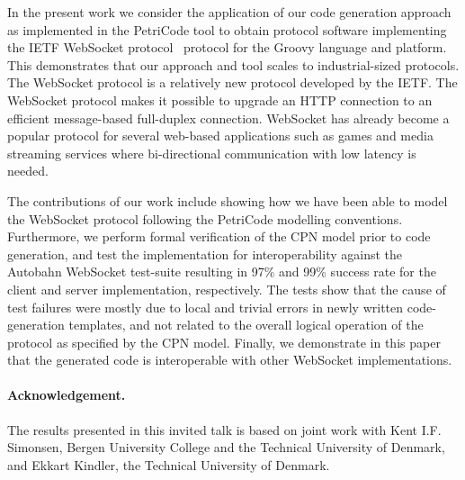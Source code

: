 \documentclass[a4paper]{llncs}
\begin{document}

In the present work we consider the application of our code generation 
approach as
implemented in the PetriCode tool to obtain protocol software
implementing the IETF WebSocket protocol~\cite{fette2011websocket}
protocol for the Groovy language and platform. This demonstrates that
our approach and tool scales to industrial-sized protocols. The
WebSocket protocol is a relatively new protocol %
developed by the IETF. The WebSocket protocol makes it possible to
upgrade an HTTP connection to an efficient message-based full-duplex
connection.  WebSocket has already become a popular protocol for
several web-based applications such as games and media streaming services
where bi-directional communication with low latency is needed.

The contributions of our work include showing how we have been able to
model the WebSocket protocol following the PetriCode modelling
conventions. Furthermore, we perform formal verification of the CPN
model prior to code generation, and test the implementation for
interoperability against the Autobahn WebSocket test-suite
\cite{Autobahn} resulting in 97\% and 99\% success rate for the client
and server implementation, respectively. The tests show that the cause
of test failures were mostly due to local and trivial errors in newly
written code-generation templates, and not related to the overall
logical operation of the protocol as specified by the CPN
model. Finally, we demonstrate in this paper that the generated code
is interoperable with other WebSocket implementations.
  
\paragraph{Acknowledgement.} The results presented in this invited talk is based on joint work with Kent I.F. Simonsen, Bergen University College and the Technical University of Denmark, and Ekkart Kindler, the Technical
University of Denmark.



%


\end{document}
